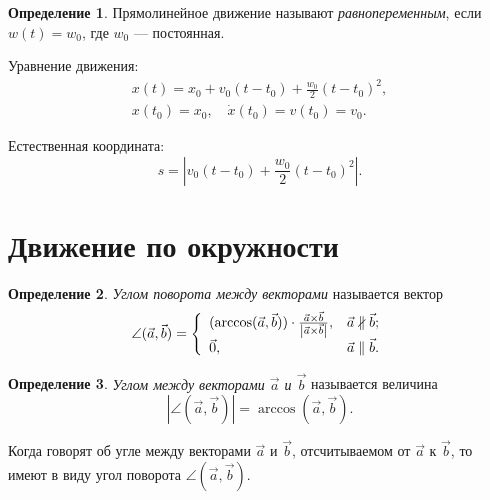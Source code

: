 \documentclass{article}
\theoremstyle{definition}
\newtheorem{definition}{Определение}[section]
\theoremstyle{plain}
\theoremstyle{remark}
\numberwithin{equation}{section}
\newcommand{\abs}[1]{\left|#1\right|}
\newcommand{\crossprod}[2]{#1 \times #2}
\begin{document}
\begin{definition}
  Прямолинейное движение называют \textit{равнопеременным}, если $w(t) = w_0$,
  где $w_0$ --- постоянная.

  Уравнение движения:
  \begin{equation*}
    \begin{gathered}
      x(t) = x_0 + v_0 (t - t_0) + \frac{w_0}{2} (t - t_0)^2, \\
      x(t_0) = x_0, \quad \dot{x}(t_0) = v(t_0) = v_0.
    \end{gathered}
  \end{equation*}

  Естественная координата:
  \begin{equation*}
    s = \abs{v_0 (t - t_0) + \frac{w_0}{2} (t - t_0)^2}.
  \end{equation*}
\end{definition}

\section{Движение по окружности}

\begin{definition}
  \textit{Углом поворота между векторами} называется вектор
  \begin{equation*}
    \angle (\vec{a}, \vec{b}) = \left\{
      \begin{array}{l l}
        (\arccos(\vec{a}, \vec{b})) \cdot
        \frac{\crossprod{\vec{a}}{\vec{b}}}
        {\abs{\crossprod{\vec{a}}{\vec{b}}}}, &
        \vec{a} \nparallel \vec{b}; \\

        \vec{0}, & \vec{a} \parallel \vec{b}.
      \end{array}
      \right.
  \end{equation*}
\end{definition}

\begin{definition}
  \textit{Углом между векторами $\vec{a}$ и $\vec{b}$} называется величина
  \begin{equation*}
    \abs{\angle (\vec{a}, \vec{b})} = \arccos(\vec{a}, \vec{b}).
  \end{equation*}
\end{definition}

Когда говорят об угле между векторами $\vec{a}$ и $\vec{b}$, отсчитываемом от
$\vec{a}$ к $\vec{b}$, то имеют в виду угол поворота $\angle(\vec{a}, \vec{b})$.
\end{document}
